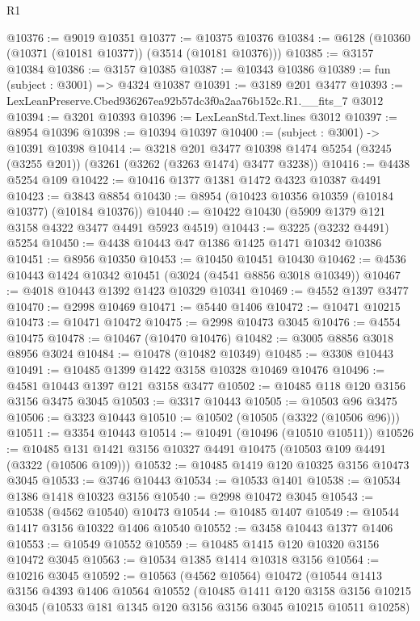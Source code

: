 \begin{lexlean}{R1}
\begin{coremodule}
@10376 := @9019 @10351
@10377 := @10375 @10376
@10384 := @6128 (@10360 (@10371 (@10181 @10377)) (@3514 (@10181 @10376)))
@10385 := @3157 @10384
@10386 := @3157 @10385
@10387 := @10343 @10386
@10389 := fun (subject : @3001) => @4324 @10387
@10391 := @3189 @201 @3477
@10393 := LexLeanPreserve.Cbed936267ea92b57dc3f0a2aa76b152c.R1.__fits_7 @3012
@10394 := @3201 @10393
@10396 := LexLeanStd.Text.lines @3012
@10397 := @8954 @10396
@10398 := @10394 @10397
@10400 := (subject : @3001) -> @10391 @10398
@10414 := @3218
    @201
    @3477
    @10398
    @1474
    @5254
    (@3245 (@3255 @201))
    (@3261 (@3262 (@3263 @1474) @3477 @3238))
@10416 := @4438 @5254 @109
@10422 := @10416 @1377 @1381 @1472 @4323 @10387 @4491
@10423 := @3843 @8854
@10430 := @8954 (@10423 @10356 @10359 (@10184 @10377) (@10184 @10376))
@10440 := @10422 @10430 (@5909 @1379 @121 @3158 @4322 @3477 @4491 @5923 @4519)
@10443 := @3225 (@3232 @4491) @5254
@10450 := @4438 @10443 @47 @1386 @1425 @1471 @10342 @10386
@10451 := @8956 @10350
@10453 := @10450 @10451 @10430
@10462 := @4536 @10443 @1424 @10342 @10451 (@3024 (@4541 @8856 @3018 @10349))
@10467 := @4018 @10443 @1392 @1423 @10329 @10341
@10469 := @4552 @1397 @3477
@10470 := @2998 @10469
@10471 := @5440 @1406
@10472 := @10471 @10215
@10473 := @10471 @10472
@10475 := @2998 @10473 @3045
@10476 := @4554 @10475
@10478 := @10467 (@10470 @10476)
@10482 := @3005 @8856 @3018 @8956 @3024
@10484 := @10478 (@10482 @10349)
@10485 := @3308 @10443
@10491 := @10485 @1399 @1422 @3158 @10328 @10469 @10476
@10496 := @4581 @10443 @1397 @121 @3158 @3477
@10502 := @10485 @118 @120 @3156 @3156 @3475 @3045
@10503 := @3317 @10443
@10505 := @10503 @96 @3475
@10506 := @3323 @10443
@10510 := @10502 (@10505 (@3322 (@10506 @96)))
@10511 := @3354 @10443
@10514 := @10491 (@10496 (@10510 @10511))
@10526 := @10485 @131 @1421 @3156 @10327 @4491 @10475 (@10503 @109 @4491 (@3322 (@10506 @109)))
@10532 := @10485 @1419 @120 @10325 @3156 @10473 @3045
@10533 := @3746 @10443
@10534 := @10533 @1401
@10538 := @10534 @1386 @1418 @10323 @3156
@10540 := @2998 @10472 @3045
@10543 := @10538 (@4562 @10540) @10473
@10544 := @10485 @1407
@10549 := @10544 @1417 @3156 @10322 @1406 @10540
@10552 := @3458 @10443 @1377 @1406
@10553 := @10549 @10552
@10559 := @10485 @1415 @120 @10320 @3156 @10472 @3045
@10563 := @10534 @1385 @1414 @10318 @3156
@10564 := @10216 @3045
@10592 := @10563
    (@4562 @10564)
    @10472
    (@10544
      @1413
      @3156
      @4393
      @1406
      @10564
      @10552
      (@10485
        @1411
        @120
        @3158
        @3156
        @10215
        @3045
        (@10533 @181 @1345 @120 @3156 @3156 @3045 @10215 @10511 @10258)

\end{coremodule}
\end{lexlean}
